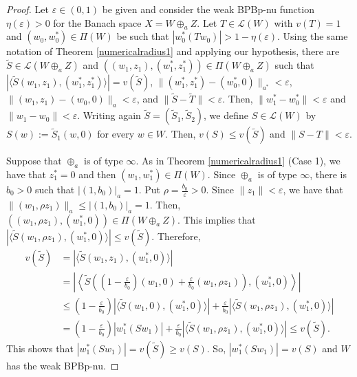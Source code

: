 \documentclass[10pt,a4paper]{amsart}
\theoremstyle{plain}
\theoremstyle{definition}
\newcommand{\eps}{\varepsilon}
\renewcommand{\leq}{\leqslant}
\renewcommand{\geq}{\geqslant}
\begin{document}
\begin{proof} Let $\eps \in (0, 1)$ be given and consider the weak BPBp-nu function $\eta(\eps) > 0$ for the Banach space $X = W \oplus_a Z$. Let $T \in \mathcal{L}(W)$ with $v(T) = 1$ and $(w_0, w_0^*) \in \Pi(W)$ be such that $|w_0^*(Tw_0)| > 1 - \eta(\eps)$. Using the same notation of Theorem \ref{numericalradius1} and applying our hypothesis, there are $\widetilde{S} \in \mathcal{L}(W \oplus_a Z)$  and $((w_1, z_1), (w_1^*, z_1^*)) \in \Pi(W \oplus_a Z)$ such that $|\langle \widetilde{S}(w_1, z_1), (w_1^*, z_1^*) \rangle | = v(\widetilde{S})$, $\|(w_1^*, z_1^*) - (w_0^*, 0)\|_{a^*} < \eps$, $\|(w_1, z_1) - (w_0, 0)\|_a < \eps$, and $\|\widetilde{S} - \widetilde{T}\| < \eps$. Then, $\|w_1^* - w_0^*\| < \eps$ and $\|w_1 - w_0\| < \eps$. Writing again $\widetilde{S} = (\widetilde{S}_1, \widetilde{S}_2)$, we define $S \in \mathcal{L}(W)$ by
$S(w) := \widetilde{S}_1(w, 0)$ for every $w \in W$. Then, $v(S) \leq v(\widetilde{S})$ and $\|S - T\| < \eps$.


Suppose that $\oplus_a$ is of type $\infty$. As in Theorem \ref{numericalradius1} (Case 1), we have that $z_1^* = 0$ and then $(w_1, w_1^*) \in \Pi(W)$. Since $\oplus_a$ is of type $\infty$, there is $b_0 > 0$ such that $|(1, b_0)|_a = 1$. Put $\rho = \frac{b_0}{\eps} > 0$. Since $\|z_1\| < \eps$, we have that $\|(w_1, \rho z_1)\|_a \leq |(1, b_0)|_a = 1$. Then, $((w_1, \rho z_1), (w_1^*, 0)) \in \Pi(W \oplus_a Z)$. This implies that $|\langle \widetilde{S}(w_1, \rho z_1), (w_1^*, 0) \rangle| \leq v(\widetilde{S})$. Therefore,
\begin{align*}
	v(\widetilde{S}) &= |\langle \widetilde{S}(w_1, z_1), (w_1^*, 0) \rangle| \\
	&= \left| \left\langle \widetilde{S} \left(	\left(1 - \frac{\eps}{b_0}\right) (w_1, 0) + \frac{\eps}{b_0} (w_1, \rho z_1) \right), (w_1^*, 0) \right\rangle \right| \\
	&\leq \left(1 - \frac{\eps}{b_0}\right) | \langle \widetilde{S}(w_1, 0), (w_1^*, 0) \rangle| + \frac{\eps}{b_0} | \langle \widetilde{S}(w_1, \rho z_1), (w_1^*, 0) \rangle| \\
	&= \left(1 - \frac{\eps}{b_0}\right) |w_1^*(Sw_1)| + \frac{\eps}{b_0} | \langle \widetilde{S}(w_1, \rho z_1), (w_1^*, 0) \rangle| \leq v(\widetilde{S}).
\end{align*}
This shows that $|w_1^*(Sw_1)| = v(\widetilde{S}) \geq v(S)$. So, $|w_1^*(Sw_1)| = v(S)$ and $W$ has the weak BPBp-nu.



\end{proof}
\end{document}

